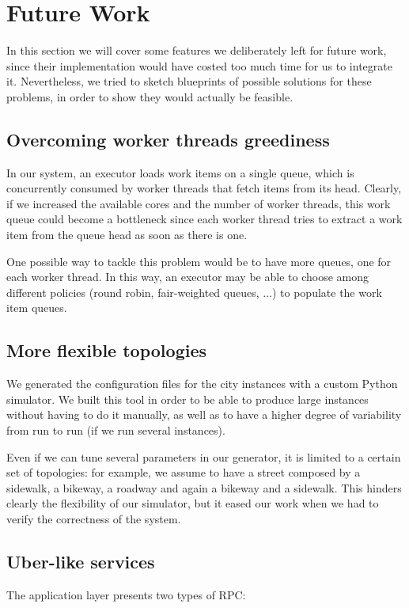 \section{Future Work}
In this section we will cover some features we deliberately left for future
work, since their implementation would have costed too much time for us to
integrate it.
Nevertheless, we tried to sketch blueprints of possible solutions for these
problems, in order to show they would actually be feasible.

\subsection{Overcoming worker threads greediness}
In our system, an executor loads work items on a single queue, which is
concurrently consumed by worker threads that fetch items from its head.
Clearly, if we increased the available cores and the number of worker threads,
this work queue could become a bottleneck since each worker thread tries to
extract a work item from the queue head as soon as there is one.

One possible way to tackle this problem would be to have more queues, one for
each worker thread. In this way, an executor may be able to choose among
different policies (round robin, fair-weighted queues, ...) to populate the
work item queues.

\subsection{More flexible topologies}
We generated the configuration files for the city instances with a custom
Python simulator. We built this tool in order to be able to produce large
instances without having to do it manually, as well as to have a higher degree
of variability from run to run (if we run several instances).

Even if we can tune several parameters in our generator, it is limited to a
certain set of topologies: for example, we assume to have a street composed by
a sidewalk, a bikeway, a roadway and again a bikeway and a sidewalk.
This hinders clearly the flexibility of our simulator, but it eased our work
when we had to verify the correctness of the system.

\subsection{Uber-like services}\label{sec:future-uber}
The application layer presents two types of RPC:

